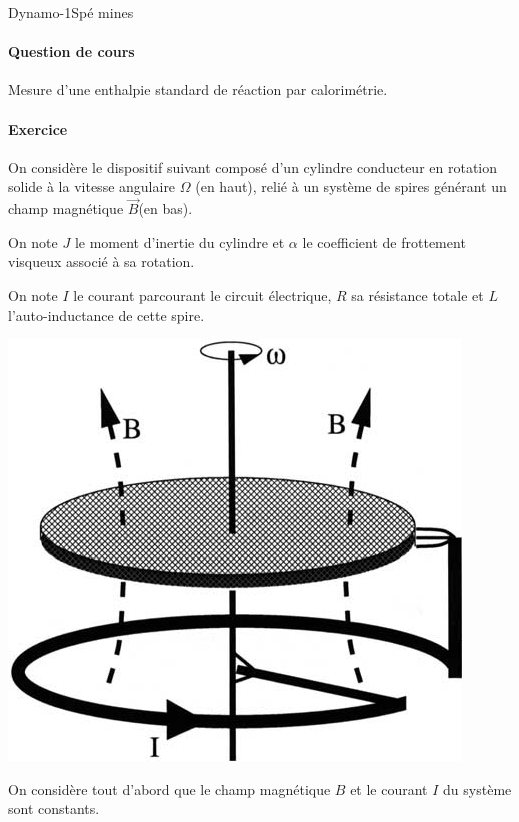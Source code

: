 \begin{exercise}{Dynamo}{-1}{Spé}
{}{mines}

\paragraph{Question de cours} 

Mesure d'une enthalpie standard de réaction par calorimétrie.

\paragraph{Exercice}

On considère le dispositif suivant composé d'un cylindre conducteur en rotation solide à la vitesse angulaire $\Omega$ (en haut), relié à un système de spires générant un champ magnétique $\vec{B}$(en bas).

On note $J$ le moment d'inertie du cylindre et $\alpha$ le coefficient de frottement visqueux associé à sa rotation.

On note $I$ le courant parcourant le circuit électrique, $R$ sa résistance totale et $L$ l'auto-inductance de cette spire.


\begin{center}
    \includegraphics[width=.5\linewidth]{oraux/mines/bullard-dynamo.png}
\end{center}

On considère tout d'abord que le champ magnétique $B$ et le courant $I$ du système sont constants.


\end{exercise}
